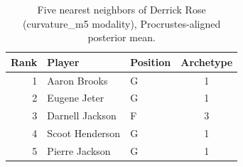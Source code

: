 \begin{table}[htbp]
  \centering\small
  \begin{tabular}{rllc}
    \toprule
    Rank & Player & Position & Archetype \\
    \midrule
    1 & Aaron Brooks & G & 1 \\
    2 & Eugene Jeter & G & 1 \\
    3 & Darnell Jackson & F & 3 \\
    4 & Scoot Henderson & G & 1 \\
    5 & Pierre Jackson & G & 1 \\
    \bottomrule
  \end{tabular}
  \caption{Five nearest neighbors of Derrick Rose (curvature_m5 modality), Procrustes-aligned posterior mean.}
  \label{tab:Derrick_Rose_neighbors_curvature_m5}
\end{table}

